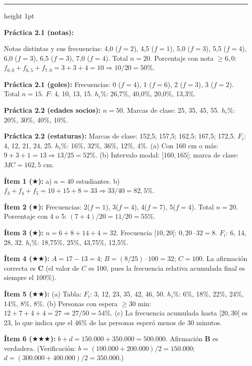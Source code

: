 \documentclass[11pt, letterpaper]{article}
\newcommand{\subbloque}[1]{%
  \vspace{14pt}
  \noindent{\large\bfseries\color{zenitnavy} #1}\par
  \vspace{4pt}\hrule height 1pt\vspace{8pt}}
\begin{document}
\subbloque{Sección 2 --- Tablas de frecuencia}

\textbf{Práctica 2.1 (notas):}

Notas distintas y sus frecuencias: 4{,}0 ($f=2$), 4{,}5 ($f=1$), 5{,}0 ($f=3$), 5{,}5 ($f=4$), 6{,}0 ($f=3$), 6{,}5 ($f=3$), 7{,}0 ($f=4$). Total $n=20$.
Porcentaje con nota $\geq 6{,}0$: $f_{6{,}0}+f_{6{,}5}+f_{7{,}0} = 3+3+4 = 10 \Rightarrow 10/20 = 50\%$.

\textbf{Práctica 2.1 (goles):}
Frecuencias: 0 ($f=4$), 1 ($f=6$), 2 ($f=3$), 3 ($f=2$). Total $n=15$.
$F$: 4, 10, 13, 15. $h_i\%$: 26{,}7\%, 40{,}0\%, 20{,}0\%, 13{,}3\%.

\textbf{Práctica 2.2 (edades socios):}
$n=50$. Marcas de clase: 25, 35, 45, 55. $h_i\%$: 20\%, 30\%, 40\%, 10\%.

\textbf{Práctica 2.2 (estaturas):}
Marcas de clase: 152{,}5; 157{,}5; 162{,}5; 167{,}5; 172{,}5.
$F_i$: 4, 12, 21, 24, 25. $h_i\%$: 16\%, 32\%, 36\%, 12\%, 4\%.
(a) Con 160 cm o más: $9+3+1=13 \Rightarrow 13/25=52\%$.
(b) Intervalo modal: $[160,165[$; marca de clase: $MC = 162{,}5$ cm.

\textbf{Ítem 1 ($\bigstar$):}
a) $n=40$ estudiantes.
b) $f_3+f_4+f_5 = 10+15+8 = 33 \Rightarrow 33/40 = 82{,}5\%$.

\textbf{Ítem 2 ($\bigstar$):}
Frecuencias: 2($f=1$), 3($f=4$), 4($f=7$), 5($f=4$). Total $n=20$.
Porcentaje con 4 o 5: $(7+4)/20 = 11/20 = 55\%$.

\textbf{Ítem 3 ($\bigstar$):}
$n = 6+8+14+4 = 32$. Frecuencia $[10,20[$: $0{,}20 \cdot 32 = 8$.
$F_i$: 6, 14, 28, 32. $h_i\%$: 18{,}75\%, 25\%, 43{,}75\%, 12{,}5\%.

\textbf{Ítem 4 ($\bigstar\bigstar$):}
$A = 17-13 = 4$; $B = (8/25)\cdot 100 = 32$; $C = 100$.
La afirmación correcta es \textbf{C} (el valor de $C$ es 100, pues la frecuencia relativa acumulada final es siempre el 100\%).

\textbf{Ítem 5 ($\bigstar\bigstar$):}
(a) Tabla: $F_i$: 3, 12, 23, 35, 42, 46, 50. $h_i\%$: 6\%, 18\%, 22\%, 24\%, 14\%, 8\%, 8\%.
(b) Personas con espera $\geq 30$ min: $12+7+4+4=27 \Rightarrow 27/50=54\%$.
(c) La frecuencia acumulada hasta $[20,30[$ es 23, lo que indica que el 46\% de las personas esperó menos de 30 minutos.

\textbf{Ítem 6 ($\bigstar\bigstar\bigstar$):}
$b+d = 150.000+350.000 = 500.000$. Afirmación \textbf{B} es verdadera.
(Verificación: $b = (100.000+200.000)/2 = 150.000$; $d = (300.000+400.000)/2 = 350.000$.)
\end{document}
